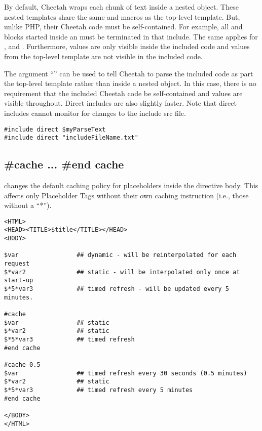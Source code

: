 By default, Cheetah wraps each chunk of  text inside a nested
 object.  These nested templates share the same 
and macros as the top-level template. But, unlike PHP, their Cheetah code must be
self-contained.  For example, all  and  blocks started
inside an  must be terminated in that include.  The same applies
for ,  and .  Furthermore, 
values are only visible inside the included code and  values from
the top-level template are not visible in the included code.

The argument ``'' can be used to tell Cheetah to parse the included
code as part the top-level template rather than inside a nested 
object.  In this case, there is no requirement that the included Cheetah code be
self-contained and  values are visible throughout.  Direct includes
are also slightly faster.  Note that direct includes cannot monitor for changes
to the include src file.

\begin{verbatim}
#include direct $myParseText
#include direct "includeFileName.txt"
\end{verbatim}

\subsection{\#cache ... \#end cache}
\label{directives.cache}

 changes the default caching policy for placeholders inside the
directive body.  This affects only Placeholder Tags without their own caching
instruction (i.e., those without a ``*'').

\begin{verbatim}
<HTML>
<HEAD><TITLE>$title</TITLE></HEAD>
<BODY>

$var                ## dynamic - will be reinterpolated for each request
$*var2              ## static - will be interpolated only once at start-up
$*5*var3            ## timed refresh - will be updated every 5 minutes.

#cache
$var                ## static
$*var2              ## static
$*5*var3            ## timed refresh
#end cache

#cache 0.5
$var                ## timed refresh every 30 seconds (0.5 minutes)
$*var2              ## static
$*5*var3            ## timed refresh every 5 minutes
#end cache

</BODY>
</HTML>
\end{verbatim}


